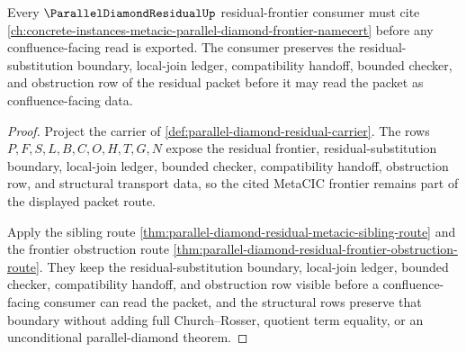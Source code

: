 \begin{theorem}
\label{thm:parallel-diamond-residual-metacic-frontier-repair}
Every $\ParallelDiamondResidualUp$ residual-frontier consumer must cite \autoref{ch:concrete-instances-metacic-parallel-diamond-frontier-namecert} before any confluence-facing read is exported. The consumer preserves the residual-substitution boundary, local-join ledger, compatibility handoff, bounded checker, and obstruction row of the residual packet before it may read the packet as confluence-facing data.
\end{theorem}
\begin{proof}
Project the carrier of \autoref{def:parallel-diamond-residual-carrier}. The rows $P,F,S,L,B,C,O,H,T,G,N$ expose the residual frontier, residual-substitution boundary, local-join ledger, bounded checker, compatibility handoff, obstruction row, and structural transport data, so the cited MetaCIC frontier remains part of the displayed packet route.

Apply the sibling route \autoref{thm:parallel-diamond-residual-metacic-sibling-route} and the frontier obstruction route \autoref{thm:parallel-diamond-residual-frontier-obstruction-route}. They keep the residual-substitution boundary, local-join ledger, bounded checker, compatibility handoff, and obstruction row visible before a confluence-facing consumer can read the packet, and the structural rows preserve that boundary without adding full Church--Rosser, quotient term equality, or an unconditional parallel-diamond theorem.
\end{proof}
